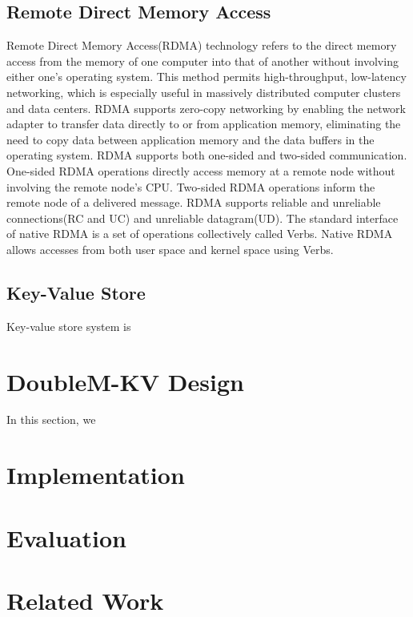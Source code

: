 \documentclass[format=acmsmall, review=false, screen=true]{acmart}
\begin{document}
\subsection{Remote Direct Memory Access}

	Remote Direct Memory Access(RDMA) technology refers to the direct memory access from the memory of one computer into that of another without involving either one's operating system. This method permits high-throughput, low-latency networking, which is especially useful in massively distributed computer clusters and data centers. RDMA supports zero-copy networking by enabling the network adapter to transfer data directly to or from application memory, eliminating the need to copy data between application memory and the data buffers in the operating system. RDMA supports both one-sided and two-sided communication. One-sided RDMA operations directly access memory at a remote node without involving the remote node’s CPU. Two-sided RDMA operations inform the remote node of a delivered message. RDMA supports reliable and unreliable connections(RC and UC) and unreliable datagram(UD). The standard interface of native RDMA is a set of operations collectively called	Verbs. Native RDMA allows accesses from both user space	and kernel space using Verbs. 
		
\subsection{Key-Value Store}
	
	Key-value store system is 
	
\section{DoubleM-KV Design}\label{sec:design}

	In this section, we 

\section{Implementation}\label{sec:implementation}
	

\section{Evaluation}\label{sec:evaluation}


\section{Related Work}\label{sec:relatedwork}
	
\end{document}
